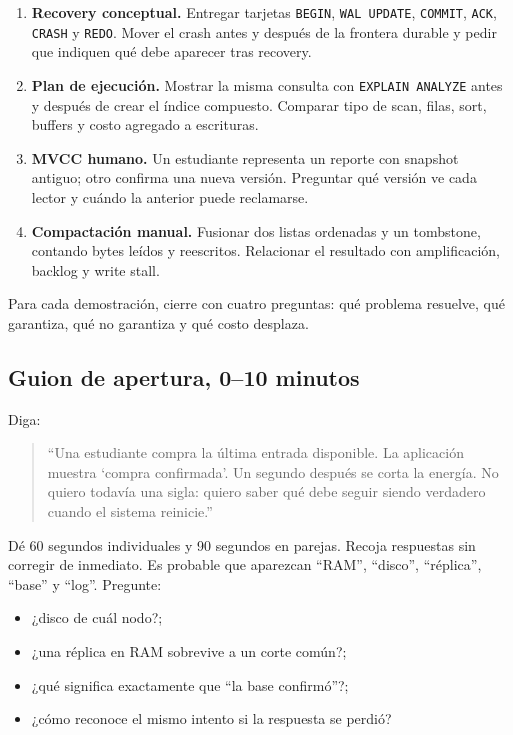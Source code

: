 \documentclass[variant=docente,cover=institutional,mode=screen]{ua-engineering-v6-article}
\begin{document}
\begin{enumerate}
\item \textbf{Recovery conceptual.} Entregar tarjetas \texttt{BEGIN}, \texttt{WAL UPDATE}, \texttt{COMMIT}, \texttt{ACK}, \texttt{CRASH} y \texttt{REDO}. Mover el crash antes y después de la frontera durable y pedir que indiquen qué debe aparecer tras recovery.
\item \textbf{Plan de ejecución.} Mostrar la misma consulta con \texttt{EXPLAIN ANALYZE} antes y después de crear el índice compuesto. Comparar tipo de scan, filas, sort, buffers y costo agregado a escrituras.
\item \textbf{MVCC humano.} Un estudiante representa un reporte con snapshot antiguo; otro confirma una nueva versión. Preguntar qué versión ve cada lector y cuándo la anterior puede reclamarse.
\item \textbf{Compactación manual.} Fusionar dos listas ordenadas y un tombstone, contando bytes leídos y reescritos. Relacionar el resultado con amplificación, backlog y write stall.
\end{enumerate}

Para cada demostración, cierre con cuatro preguntas: qué problema resuelve, qué garantiza, qué no garantiza y qué costo desplaza.

\subsection{Guion de apertura, 0--10 minutos}

Diga:

\begin{quote}
``Una estudiante compra la última entrada disponible. La aplicación muestra `compra confirmada'. Un segundo después se corta la energía. No quiero todavía una sigla: quiero saber qué debe seguir siendo verdadero cuando el sistema reinicie.''
\end{quote}

Dé 60 segundos individuales y 90 segundos en parejas. Recoja respuestas sin corregir de inmediato. Es probable que aparezcan ``RAM'', ``disco'', ``réplica'', ``base'' y ``log''. Pregunte:

\begin{itemize}
\item ¿disco de cuál nodo?;
\item ¿una réplica en RAM sobrevive a un corte común?;
\item ¿qué significa exactamente que ``la base confirmó''?;
\item ¿cómo reconoce el mismo intento si la respuesta se perdió?
\end{itemize}
\end{document}
